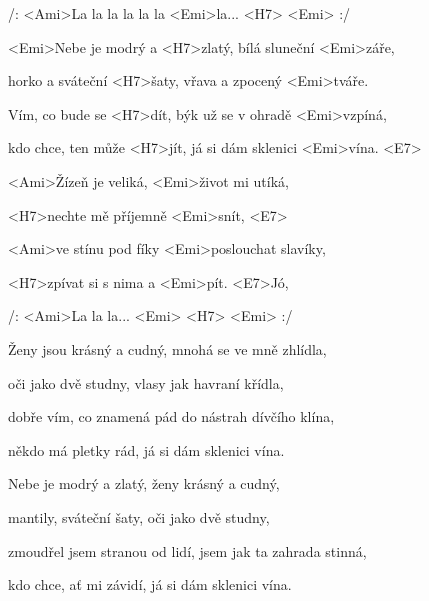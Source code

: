 

/: <Ami>La la la la la la <Emi>la... <H7> <Emi> :/

\zs
<Emi>Nebe je modrý a <H7>zlatý, bílá sluneční <Emi>záře,

horko a sváteční <H7>šaty, vřava a zpocený <Emi>tváře.

Vím, co bude se <H7>dít, býk už se v ohradě <Emi>vzpíná,

kdo chce, ten může <H7>jít, já si dám sklenici <Emi>vína. <E7>
\ks

\zr
<Ami>Žízeň je veliká, <Emi>život mi utíká,

<H7>nechte mě příjemně <Emi>snít, <E7>

<Ami>ve stínu pod fíky <Emi>poslouchat slavíky,

<H7>zpívat si s nima a <Emi>pít. <E7>Jó,

/: <Ami>La la la... <Emi> <H7> <Emi> :/

\kr

\zs
Ženy jsou krásný a cudný, mnohá se ve mně zhlídla,

oči jako dvě studny, vlasy jak havraní křídla,

dobře vím, co znamená pád do nástrah dívčího klína,

někdo má pletky rád, já si dám sklenici vína.
\ks

\zr \kr

\zs
Nebe je modrý a zlatý, ženy krásný a cudný,

mantily, sváteční šaty, oči jako dvě studny,

zmoudřel jsem stranou od lidí, jsem jak ta zahrada stinná,

kdo chce, ať mi závidí, já si dám sklenici vína.
\ks

\zr \kr

\kp

